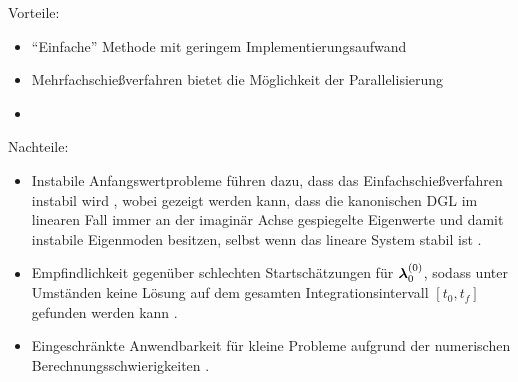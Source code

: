 \begin{multicols}{2}
	Vorteile:
	\begin{itemize}
		\item ``Einfache'' Methode mit geringem Implementierungsaufwand \cite{Ascher.1995c4}\vspace{\fill}
		\item Mehrfachschießverfahren bietet die Möglichkeit der Parallelisierung \cite{Betts.1998}\vspace{\fill}
		\item[\vspace{\fill}]
	\end{itemize}
	
	\columnbreak
	
	Nachteile:
	\begin{itemize}
		\item Instabile Anfangswertprobleme führen dazu, dass das Einfachschießverfahren instabil wird \cite{Ascher.1995c4}, wobei gezeigt werden kann, dass die kanonischen \gls{DGL} im linearen Fall immer an der imaginär Achse gespiegelte Eigenwerte und damit instabile Eigenmoden besitzen, selbst wenn das lineare System stabil ist \cite{KnutGraichen.2012}. 
		\item Empfindlichkeit gegenüber schlechten Startschätzungen für $\boldsymbol{\lambda}_0^{(0)}$, sodass unter Umständen keine Lösung auf dem gesamten Integrationsintervall $[t_0, t_f]$ gefunden werden kann \cite{Ascher.1995c4}.
		\item Eingeschränkte Anwendbarkeit für kleine Probleme aufgrund der numerischen Berechnungsschwierigkeiten \cite{Papageorgiou.2012}.
	\end{itemize}
\end{multicols}

